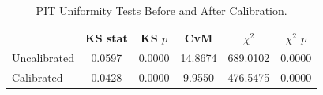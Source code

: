 \begin{table}[H]
\centering
\caption{PIT Uniformity Tests Before and After Calibration.}
\label{tab:results_pit_uncal}
\small
\begin{tabular}{lccccc}
\toprule
& KS stat & KS $p$ & CvM & $\chi^2$ & $\chi^2$ $p$ \\
\midrule
Uncalibrated & 0.0597 & 0.0000 & 14.8674 & 689.0102 & 0.0000 \\
Calibrated & 0.0428 & 0.0000 & 9.9550 & 476.5475 & 0.0000 \\
\bottomrule
\end{tabular}
\end{table}
